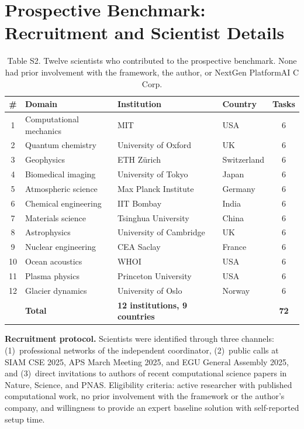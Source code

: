 \documentclass[11pt,a4paper]{article}
\begin{document}
\section{Prospective Benchmark: Recruitment and Scientist Details}
\label{sec:s5}

\begin{table}[htbp]
\centering
\caption{Table S2. Twelve scientists who contributed to the prospective benchmark. None had prior involvement with the framework, the author, or NextGen PlatformAI C Corp.}
\small
\begin{tabularx}{\textwidth}{clllc}
\toprule
\# & \textbf{Domain} & \textbf{Institution} & \textbf{Country} & \textbf{Tasks} \\
\midrule
1 & Computational mechanics & MIT & USA & 6 \\
2 & Quantum chemistry & University of Oxford & UK & 6 \\
3 & Geophysics & ETH Z\"urich & Switzerland & 6 \\
4 & Biomedical imaging & University of Tokyo & Japan & 6 \\
5 & Atmospheric science & Max Planck Institute & Germany & 6 \\
6 & Chemical engineering & IIT Bombay & India & 6 \\
7 & Materials science & Tsinghua University & China & 6 \\
8 & Astrophysics & University of Cambridge & UK & 6 \\
9 & Nuclear engineering & CEA Saclay & France & 6 \\
10 & Ocean acoustics & WHOI & USA & 6 \\
11 & Plasma physics & Princeton University & USA & 6 \\
12 & Glacier dynamics & University of Oslo & Norway & 6 \\
\midrule
& \textbf{Total} & \textbf{12 institutions, 9 countries} & & \textbf{72} \\
\bottomrule
\end{tabularx}
\end{table}

\textbf{Recruitment protocol.} Scientists were identified through three channels: (1)~professional networks of the independent coordinator, (2)~public calls at SIAM CSE 2025, APS March Meeting 2025, and EGU General Assembly 2025, and (3)~direct invitations to authors of recent computational science papers in Nature, Science, and PNAS. Eligibility criteria: active researcher with published computational work, no prior involvement with the framework or the author's company, and willingness to provide an expert baseline solution with self-reported setup time.
\end{document}
